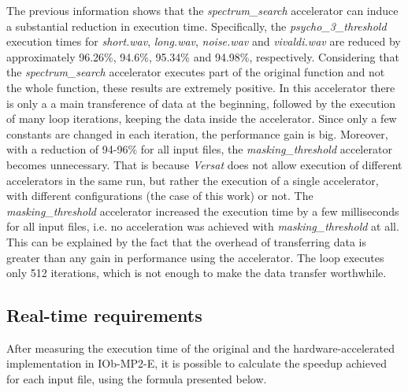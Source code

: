 The previous information shows that the \textit{spectrum\_search} accelerator can induce a substantial reduction in execution time. Specifically, the \textit{psycho\_3\_threshold} execution times for \textit{short.wav}, \textit{long.wav}, \textit{noise.wav} and \textit{vivaldi.wav} are reduced by approximately 96.26\%, 94.6\%, 95.34\% and 94.98\%, respectively.
Considering that the \textit{spectrum\_search} accelerator executes part of the original function and not the whole function, these results are extremely positive. In this accelerator there is only a a main transference of data at the beginning, followed by the execution of many loop iterations, keeping the data inside the accelerator. Since only a few constants are changed in each iteration, the performance gain is big.
Moreover, with a reduction of 94-96\% for all input files, the \textit{masking\_threshold} accelerator becomes unnecessary. That is because \textit{Versat} does not allow execution of different accelerators in the same run, but rather the execution of a single accelerator, with different configurations (the case of this work) or not.
The \textit{masking\_threshold} accelerator increased the execution time by a few milliseconds for all input files, i.e. no acceleration was achieved with \textit{masking\_threshold} at all. This can be explained by the fact that the overhead of transferring data is greater than any gain in performance using the accelerator. The loop executes only 512 iterations, which is not enough to make the data transfer worthwhile.


\subsection{Real-time requirements}


After measuring the execution time of the original and the hardware-accelerated implementation in IOb-MP2-E, it is possible to calculate the speedup achieved for each input file, using the formula presented below.

